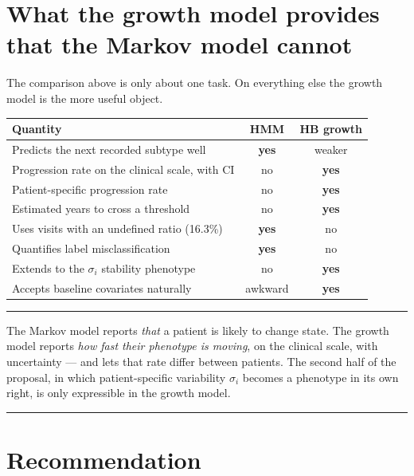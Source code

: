 \documentclass[11pt,a4paper]{article}
\newenvironment{keypoint}
  {\begin{center}\begin{minipage}{0.94\textwidth}%
   \vspace{4pt}\hrule\vspace{7pt}\small}
  {\vspace{7pt}\hrule\vspace{4pt}\end{minipage}\end{center}}
\begin{document}
\section{What the growth model provides that the Markov model cannot}

The comparison above is only about one task. On everything else the growth
model is the more useful object.

\begin{table}[H]
\centering
\begin{tabular}{@{}p{7.3cm}cc@{}}
\toprule
\textbf{Quantity} & \textbf{HMM} & \textbf{HB growth} \\
\midrule
Predicts the next recorded subtype well          & \textbf{yes} & weaker \\
Progression rate on the clinical scale, with CI  & no  & \textbf{yes} \\
Patient-specific progression rate                & no  & \textbf{yes} \\
Estimated years to cross a threshold             & no  & \textbf{yes} \\
Uses visits with an undefined ratio (16.3\%)     & \textbf{yes} & no \\
Quantifies label misclassification               & \textbf{yes} & no \\
Extends to the $\sigma_i$ stability phenotype    & no  & \textbf{yes} \\
Accepts baseline covariates naturally            & awkward & \textbf{yes} \\
\bottomrule
\end{tabular}
\end{table}

\begin{keypoint}
The Markov model reports \emph{that} a patient is likely to change state. The
growth model reports \emph{how fast their phenotype is moving}, on the clinical
scale, with uncertainty --- and lets that rate differ between patients. The
second half of the proposal, in which patient-specific variability $\sigma_i$
becomes a phenotype in its own right, is only expressible in the growth model.
\end{keypoint}

\section{Recommendation}
\end{document}
